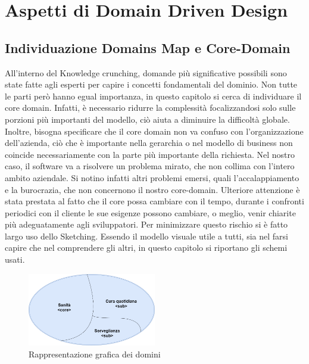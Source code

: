 \chapter{Aspetti di Domain Driven Design}

    \section{Individuazione Domains Map e Core-Domain}	
    All'interno del Knowledge crunching, domande più significative possibili sono state fatte agli esperti per capire i concetti fondamentali del dominio.
    Non tutte le parti però hanno egual importanza, in questo capitolo si cerca di individuare il core domain. Infatti, è necessario ridurre la complessità focalizzandosi solo sulle porzioni più importanti del modello, ciò aiuta a diminuire la difficoltà globale.
    Inoltre, bisogna specificare che il core domain non va confuso con l’organizzazione dell'azienda, ciò che è importante nella gerarchia o nel modello di business non coincide necessariamente con la parte più importante della richiesta. Nel nostro caso, il software va a risolvere un problema mirato, che non collima con l'intero ambito aziendale. Si notino infatti altri problemi emersi, quali l'accalappiamento e la burocrazia, che non concernono il nostro core-domain.
    Ulteriore attenzione è stata prestata al fatto che il core possa cambiare con il tempo, durante i confronti periodici con il cliente le sue esigenze possono cambiare, o meglio, venir chiarite più adeguatamente agli sviluppatori.
    Per minimizzare questo rischio si è fatto largo uso dello Sketching. Essendo il modello visuale utile a tutti, sia nel farsi capire che nel comprendere gli altri, in questo capitolo si riportano gli schemi usati.
    
    
    \begin{figure}[H]
        \caption{Rappresentazione grafica dei domini}
        \centering
        \includegraphics[width=0.5\textwidth]{DrawIo/domainsMap.png}
    \end{figure}
    
